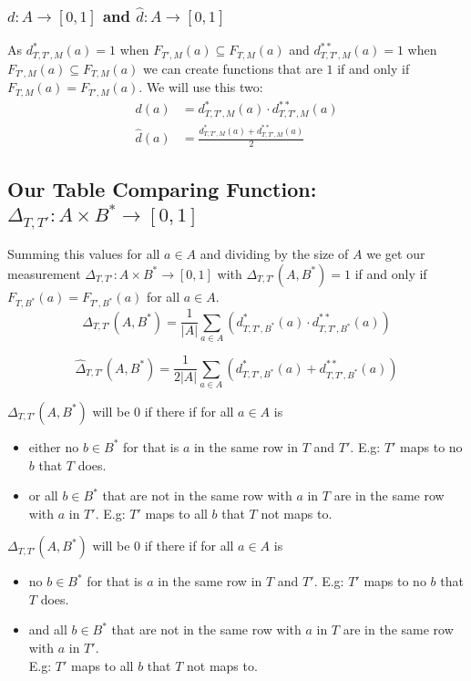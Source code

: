 \subsubsection{$d : A \to [0,1]$ and $\hat{d} : A \to [0,1]$}

As $d^*_{T,T',M}(a) = 1$ when $F_{T', M}(a) \subseteq F_{T, M}(a)$ and $d^{**}_{T,T',M}(a) = 1$ when $F_{T', M}(a) \subseteq F_{T, M}(a)$ we can create functions that are $1$ if and only if $F_{T, M}(a) = F_{T', M}(a)$.
We will use this two:
\[
\begin{array}{ll}
  d(a) & = d^*_{T,T',M}(a) \cdot d^{**}_{T,T',M}(a)
  \\[1em]
  \hat{d}(a) & = \frac{d^*_{T,T',M}(a) + d^{**}_{T,T',M}(a)}{2}
\end{array}
\]

\subsection{Our Table Comparing Function: $\Delta_{T,T'} : A \times B^* \to [0,1]$}

Summing this values for all $a \in A$ and dividing by the size of $A$ we get our measurement \mbox{$\Delta_{T,T'} : A \times B^* \to [0,1]$}
with $\Delta_{T,T'}(A, B^*) = 1$ if and only if $F_{T, B^*}(a) = F_{T', B^*}(a)$ for all $a \in A$.
\begin{equation}
  \Delta_{T,T'}(A, B^*) = 
    \frac{1}{|A|} 
    \sum_{a \in A} (d^*_{T,T',B^*}(a) \cdot d^{**}_{T,T',B^*}(a))
\end{equation}

% 
\begin{equation}
  \hat{\Delta}_{T,T'}(A, B^*) = 
    \frac{1}{2 |A|} 
    \sum_{a \in A} (d^*_{T,T',B^*}(a) + d^{**}_{T,T',B^*}(a))
\end{equation}
 
 
$\Delta_{T,T'}(A, B^*)$ will be $0$ if there if for all $a \in A$ is
\begin{itemize}
\item either no $b \in B^*$ for that is $a$ in the same row in $T$ and $T'$.
  E.g: $T'$ maps to no $b$ that $T$ does.
\item or all $b \in B^*$ that are not in the same row with $a$ in $T$ are in the same row with $a$ in $T'$.
  E.g: $T'$ maps to all $b$ that $T$ not maps to.
\end{itemize}

$\Delta_{T,T'}(A, B^*)$ will be $0$ if there if for all $a \in A$ is
\begin{itemize}
\item no $b \in B^*$ for that is $a$ in the same row in $T$ and $T'$.
  E.g: $T'$ maps to no $b$ that $T$ does.
\item and all $b \in B^*$ that are not in the same row with $a$ in $T$ are in the same row with $a$ in $T'$.
  \\ E.g: $T'$ maps to all $b$ that $T$ not maps to.
\end{itemize}

